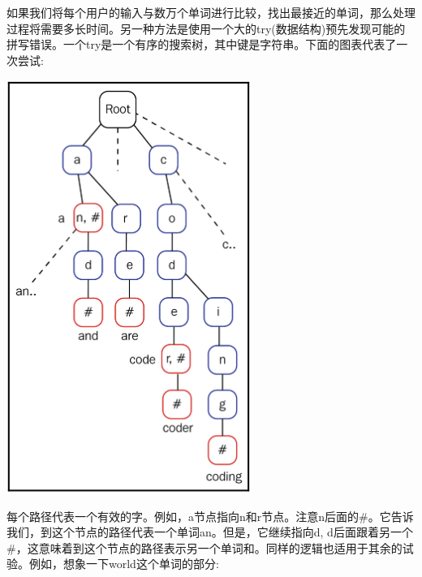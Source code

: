 如果我们将每个用户的输入与数万个单词进行比较，找出最接近的单词，那么处理过程将需要多长时间。另一种方法是使用一个大的try(数据结构)预先发现可能的拼写错误。一个try是一个有序的搜索树，其中键是字符串。下面的图表代表了一次尝试: \par

\begin{center}
	\includegraphics[width=0.6\textwidth]{content/Section-3/Chapter-16/5}
\end{center}

每个路径代表一个有效的字。例如，a节点指向n和r节点。注意n后面的\#。它告诉我们，到这个节点的路径代表一个单词an。但是，它继续指向d, d后面跟着另一个\#，这意味着到这个节点的路径表示另一个单词和。同样的逻辑也适用于其余的试验。例如，想象一下world这个单词的部分: \par

